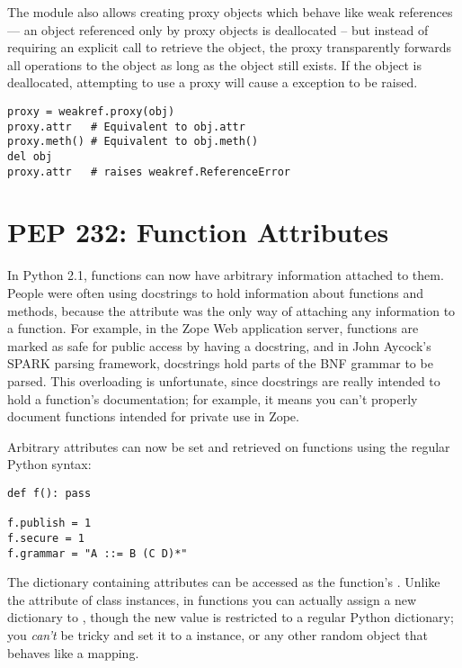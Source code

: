 \documentclass{howto}
\begin{document}
The  module also allows creating proxy objects which
behave like weak references --- an object referenced only by proxy
objects is deallocated -- but instead of requiring an explicit call to
retrieve the object, the proxy transparently forwards all operations
to the object as long as the object still exists.  If the object is
deallocated, attempting to use a proxy will cause a
 exception to be raised.

\begin{verbatim}
proxy = weakref.proxy(obj)
proxy.attr   # Equivalent to obj.attr
proxy.meth() # Equivalent to obj.meth()
del obj
proxy.attr   # raises weakref.ReferenceError
\end{verbatim}

\begin{seealso}


\end{seealso}

\section{PEP 232: Function Attributes}

In Python 2.1, functions can now have arbitrary information attached
to them.  People were often using docstrings to hold information about
functions and methods, because the  attribute was the
only way of attaching any information to a function.  For example, in
the Zope Web application server, functions are marked as safe for
public access by having a docstring, and in John Aycock's SPARK
parsing framework, docstrings hold parts of the BNF grammar to be
parsed.  This overloading is unfortunate, since docstrings are really
intended to hold a function's documentation; for example, it means you
can't properly document functions intended for private use in Zope.

Arbitrary attributes can now be set and retrieved on functions using the
regular Python syntax:

\begin{verbatim}
def f(): pass

f.publish = 1
f.secure = 1
f.grammar = "A ::= B (C D)*"
\end{verbatim}

The dictionary containing attributes can be accessed as the function's
. Unlike the  attribute of class
instances, in functions you can actually assign a new dictionary to
, though the new value is restricted to a regular
Python dictionary; you \emph{can't} be tricky and set it to a
 instance, or any other random object that behaves
like a mapping.
\end{document}
